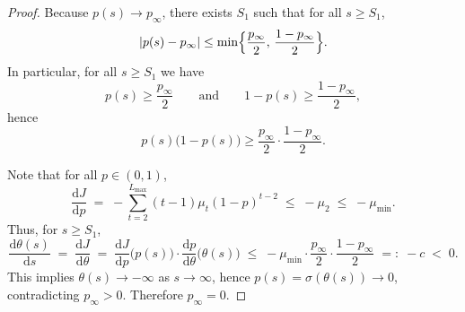 \documentclass{llmxive}
\begin{document}
\begin{proof}
Because $p(s)\to p_\infty$, there exists $S_1$ such that for all $s \geq S_1$,
\begin{equation}
    |p(s)-p_\infty| \le \min\Bigl\{\frac{p_\infty}{2},\,\frac{1-p_\infty}{2}\Bigr\}.
\end{equation}
In particular, for all $s\ge S_1$ we have
\begin{equation}
    p(s)\ge \frac{p_\infty}{2}
    \qquad\text{and}\qquad
    1-p(s)\ge \frac{1-p_\infty}{2},
\end{equation}
hence
\begin{equation}
    p(s)\bigl(1-p(s)\bigr)\ge \frac{p_\infty}{2}\cdot \frac{1-p_\infty}{2}.
\end{equation}

Note that for all $p\in(0,1)$,
\begin{equation}
    \frac{\mathrm{d}J}{\mathrm{d}p}
    \;=\; -\sum_{t=2}^{L_{\max}} (t-1)\mu_t (1-p)^{t-2}
    \;\leq\; -\mu_2
    \;\leq\; -\mu_{\min}.
\end{equation}
Thus, for $s \geq S_1$,
\begin{equation}
    \frac{\mathrm{d}\theta(s)}{\mathrm{d}s}
    \;=\; \frac{\mathrm{d}J}{\mathrm{d}\theta}
    \;=\; \frac{\mathrm{d}J}{\mathrm{d}p}\bigl(p(s)\bigr)\cdot \frac{\mathrm{d}p}{\mathrm{d}\theta}\bigl(\theta(s)\bigr)
    \;\leq\; -\mu_{\min}\cdot \frac{p_\infty}{2}\cdot \frac{1-p_\infty}{2}
    \;=:\; -c \;<\; 0.
\end{equation}
This implies $\theta(s) \to -\infty$ as $s\to\infty$, hence $p(s)=\sigma(\theta(s))\to 0$, contradicting $p_\infty>0$. Therefore $p_\infty=0$.


\end{proof}
\end{document}
